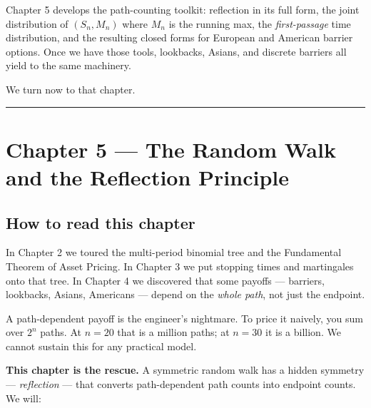 \documentclass[
  10pt,
  twoside]{book}
\begin{document}
Chapter 5 develops the path-counting toolkit: reflection in its full
form, the joint distribution of \((S_n, M_n)\) where \(M_n\) is the
running max, the \emph{first-passage} time distribution, and the
resulting closed forms for European and American barrier options. Once
we have those tools, lookbacks, Asians, and discrete barriers all yield
to the same machinery.

We turn now to that chapter.

\begin{center}\rule{0.5\linewidth}{0.5pt}\end{center}

\newpage

\chapter{Chapter 5 --- The Random Walk and the Reflection
Principle}\label{chapter-5-the-random-walk-and-the-reflection-principle}

\section{How to read this chapter}\label{how-to-read-this-chapter-4}

In Chapter 2 we toured the multi-period binomial tree and the
Fundamental Theorem of Asset Pricing. In Chapter 3 we put stopping times
and martingales onto that tree. In Chapter 4 we discovered that some
payoffs --- barriers, lookbacks, Asians, Americans --- depend on the
\emph{whole path}, not just the endpoint.

A path-dependent payoff is the engineer's nightmare. To price it
naively, you sum over \(2^n\) paths. At \(n = 20\) that is a million
paths; at \(n = 30\) it is a billion. We cannot sustain this for any
practical model.

\textbf{This chapter is the rescue.} A symmetric random walk has a
hidden symmetry --- \emph{reflection} --- that converts path-dependent
path counts into endpoint counts. We will:
\end{document}

